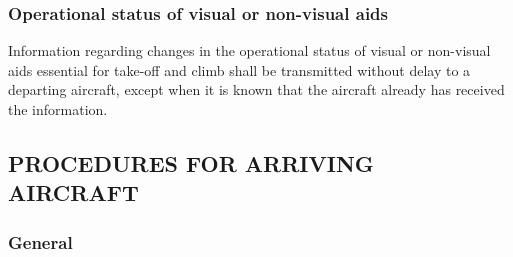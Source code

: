 \subsubsection{Operational status of visual or non-visual aids}

Information regarding changes in the operational status of visual or non-visual aids essential for take-off and climb shall be transmitted without delay to a departing aircraft, except when it is known that the aircraft already has received the information.

\subsection[Procedures for arriving aircraft]{PROCEDURES FOR ARRIVING AIRCRAFT}

\subsubsection{General}

